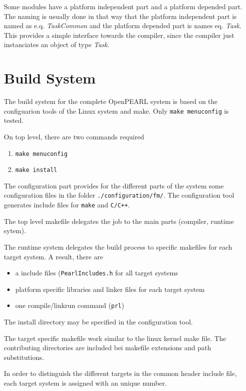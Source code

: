 	Some modules have a platform independent part and a platform
	depended part. The naming is usually done in that way that the 
	platform independent part is named as e.q. {\em TaskCommon} and the 
	platform depended part is names eq. {\em Task}. This provides a simple
	interface towards the compiler, since the compiler just instanciates
	an object of type {\em Task}.

	\section{Build System}
	\label{sec:buildsystem}
	The build system for the complete OpenPEARL system is based on the 
	configuarion tools of the Linux system and make.
	Only \texttt{make menuconfig} is tested.

	On top level, there are two commands required
	\begin{enumerate}
	\item \texttt{make menuconfig}
	\item \texttt{make install}
	\end{enumerate}

	The configuration part provides for the different parts of the system
	some configuration files in the folder \texttt{./configuration/fm/}.
	The configuration tool generates include files for \texttt{make} and
	\texttt{C/C++}.

	The top level makefile delegates the job to the main parts
	 (compiler, runtime sytem).

	The runtime system delegates the build process to specific makefiles 
	for each target system. A result, there are
	\begin{itemize}
	\item a include files (\texttt{PearlIncludes.h} for all target systems
	\item platform specific libraries and linker files for each target system
	\item one compile/linkrun command (\texttt{prl})
	\end{itemize}
	The install directory may be specified in the configuration tool.

	The target specific makefile work similar to the linux kernel make file.
	The contributing directories are included bei makefile extensions and
	path substitutions.

	In order to distinguish the different targets in the common header include
	file, each target system is assigned with an unique number.


